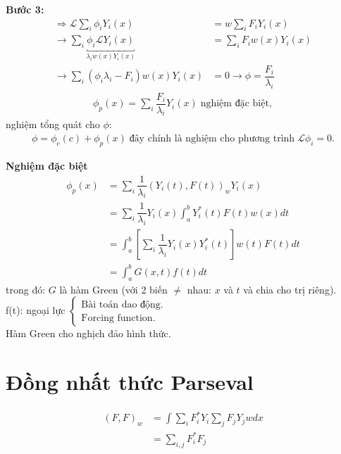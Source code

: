\documentclass{report}
\newcommand{\f}[2]{\dfrac{#1}{#2}}
\begin{document}
\textbf{Bước 3:}
\begin{align*}
	\Rightarrow \mathcal{L}\sum_i \phi_i Y_i(x) &= w\sum_{i}F_i Y_i(x) \\ 
	\rightarrow \sum_{i} \underbracket{\phi_i \mathcal{L} Y_i(x)}_{\lambda_i w(x)Y_i(x)} &= \sum_{i} F_i w(x) Y_i(x)  \\
	\rightarrow \sum_{i}\left( \phi_i \lambda_i - F_i \right)w(x) Y_i(x) &= 0 \rightarrow \phi = \f{F_i}{\lambda_i}
\end{align*}
\begin{align*}
	\phi_p (x) = \sum_{i} \f{F_i}{\lambda_i} Y_i(x) \; \text{nghiệm đặc biệt},
\end{align*}
nghiệm tổng quát cho $\phi$:
\begin{align*}
	\phi = \phi_c(c) + \phi_p(x) \; \text{đây chính là nghiệm cho phương trình} \; \mathcal{L}\phi_i = 0.
\end{align*}

\textbf{Nghiệm đặc biệt}
\begin{align*}
	\phi_p(x) &= \sum_{i} \f{1}{\lambda_i}\left( Y_i(t), F(t) \right)_w Y_i(x) \\
	& = \sum_{i} \f{1}{\lambda_i} Y_i(x) \int_{a}^{b} Y^{\ast}_{i}(t) F(t)w(x)dt \\
	& = \int_{a}^{b} \left[ \sum_{i} \f{1}{\lambda_i} Y^{}_{i}(x) Y^{\ast}_{i}(t) \right]w(t)F(t)dt \\
	& = \int_{a}^{b} G(x,t)f(t)dt
\end{align*}
trong đó: $G$ là hàm Green (với 2 biến $\neq$ nhau: $x$ và $t$ và chia cho trị riêng).\\
f(t): ngoại lực
$\begin{cases}
	\text{Bài toán dao động.}\\
	\text{Forcing function.}
\end{cases}$\\
Hàm Green cho nghịch đảo hình thức.
\section{Đồng nhất thức Parseval}
\begin{align*}
	(F,F)_w  &= \int \sum_{i} F^{\ast}_i Y^{}_i \sum_{j} F_j Y_j w dx \\
	& = \sum_{i,j} F^{\ast}_i F_j
\end{align*}
\end{document}
